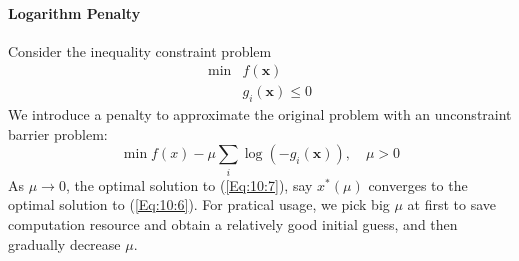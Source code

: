 \paragraph{Logarithm Penalty}
Consider the inequality constraint problem
\begin{equation}\label{Eq:10:6}
\begin{array}{ll}
\min&f(\bm x)\\
&g_i(\bm x)\le0
\end{array}
\end{equation}
We introduce a penalty to approximate the original problem with an unconstraint barrier problem:
\begin{equation}\label{Eq:10:7}
\min f(x)-\mu\sum_{i}\log(-g_i(\bm x)),\quad\mu>0
\end{equation}
As $\mu\to0$, the optimal solution to (\ref{Eq:10:7}), say $x^*(\mu)$ converges to the optimal solution to (\ref{Eq:10:6}). For pratical usage, we pick big $\mu$ at first to save computation resource and obtain a relatively good initial guess, and then gradually decrease $\mu$.
